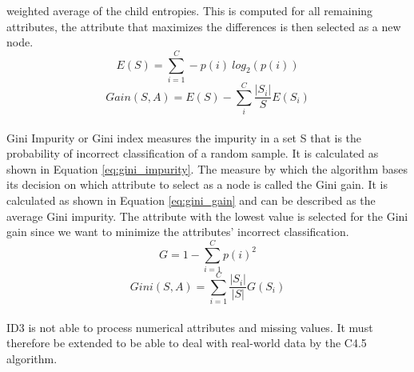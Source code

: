 weighted average of the child entropies. This is computed for all remaining 
attributes, the attribute that maximizes the differences is then selected as a 
new node.\cite{RN165}
\begin{equation}
 E(S) = \sum_{i=1}^C -p(i) \ log_2(p(i))
 \label{eq:entropy}
\end{equation}
\begin{equation}
 Gain(S, A) = E(S) - \sum_{i}^{C} \frac{|S_i|}{S} E(S_i)
 \label{eq:gain}
\end{equation}
\\
Gini Impurity or Gini index measures the impurity in a set S that is the 
probability of incorrect classification of a random sample. It is calculated 
as shown in Equation \ref{eq:gini_impurity}. The measure by which the algorithm 
bases its decision on which attribute to select as a node is called the Gini 
gain. It is calculated as shown in Equation \ref{eq:gini_gain} and can be 
described as the average Gini impurity. The attribute with the lowest value is 
selected for the Gini gain since we want to minimize the attributes' incorrect 
classification. \cite{RN171}
\begin{equation}
 G = 1 - \sum_{i=1}^C p(i)^2
 \label{eq:gini_impurity}
\end{equation}
\begin{equation}
 Gini(S, A) = \sum_{i=1}^C \frac{|S_i|}{|S|} G(S_i)
 \label{eq:gini_gain}
\end{equation}
\\
ID3 is not able to process numerical attributes and missing values. It must 
therefore be extended to be able to deal with real-world data by the C4.5 
algorithm.
